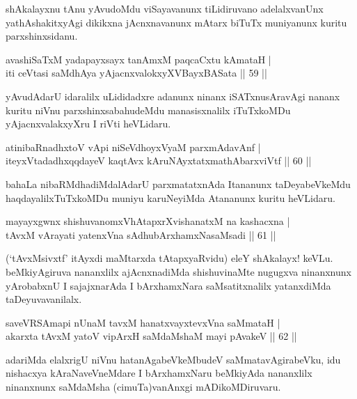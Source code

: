 \begin{artha}
shAkalayxnu tAnu yAvudoMdu viSayavanunx tiLidiruvano adelalxvanUnx yathAshakitxyAgi dikikxna jAcnxnavanunx mAtarx biTuTx muniyanunx kuritu parxshinxsidanu.
\end{artha}

\begin{shl}
avashiSaTxM yadapayxsayx tanAmxM paqcaCxtu kAmataH |\\
iti ceVtasi saMdhAya yAjacnxvalokxyXV\s BayxBASata \hfill || 59 ||
\end{shl}

\begin{artha}
yAvudAdarU idaralilx uLididadxre adanunx ninanx iSATxnusAravAgi nananx kuritu niVnu parxshinxsabahudeMdu manasisxnalilx iTuTxkoMDu yAjacnxvalakxyXru I riVti heVLidaru.
\end{artha}

\begin{shl}
atinibaRnadhxtoV vA\s pi niSeVdhoyxV\s yaM parxmAdavAnf |\\
iteyxVtadadhxqqdayeV kaqtAvx kAruNAyxtatxmathAbarxviVtf \hfill || 60 ||
\end{shl}

\begin{artha}
bahaLa nibaRMdhadiMdalAdarU parxmatatxnAda Itananunx taDeyabeVkeMdu haqdayalilxTuTxkoMDu muniyu karuNeyiMda Atananunx kuritu heVLidaru.
\end{artha}%

\begin{shl}
mayayxgwnx shishuvanomxVhAtapxrXvishanatxM na kashacxna |\\
tAvxM vArayati yatenxVna sAdhubArxhamxNasaMsadi \hfill || 61 ||
\end{shl}

\begin{artha}
(`tAvxMsivxtf' itAyxdi maMtarxda tAtapxyaRvidu) eleY shAkalayx! keVLu. beMkiyAgiruva nananxlilx ajAcnxnadiMda shishuvinaMte nugugxva ninanxnunx yArobabxnU I sajajxnarAda I bArxhamxNara saMsatitxnalilx yatanxdiMda taDeyuvavanilalx.
\end{artha}

\begin{shl}
saveVRSAmapi nUnaM tavxM hanatxvayxtevxVna saMmataH |\\
akarxta tAvxM yatoV vipArxH saMdaMshaM mayi pAvakeV \hfill || 62 ||
\end{shl}

\begin{artha}
adariMda elalxrigU niVnu hatanAgabeVkeMbudeV saMmatavAgirabeVku, idu nishacxya kAraNaveVneMdare I bArxhamxNaru beMkiyAda nananxlilx ninanxnunx saMdaMsha (cimuTa)vanAnxgi mADikoMDiruvaru.
\end{artha}

